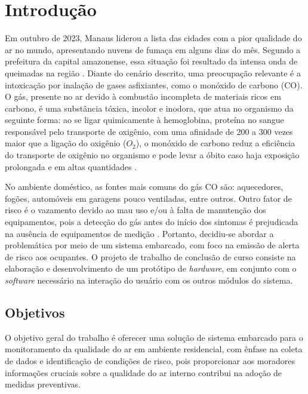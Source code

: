 \chapter{Introdução}

Em outubro de 2023, Manaus liderou a lista das cidades com a pior qualidade do ar no mundo, apresentando nuvens 
de fumaça em alguns dias do mês. Segundo a prefeitura da capital amazonense, essa situação foi resultado da 
intensa onda de queimadas na região \cite{G1-ar-manaus}. Diante do cenário descrito, uma preocupação relevante 
é a intoxicação por inalação de gases asfixiantes, como o monóxido de carbono (CO). O gás, presente no ar devido à combustão 
incompleta de materiais ricos em carbono, é uma substância tóxica, incolor e inodora, que atua no organismo da 
seguinte forma: ao se ligar quimicamente à hemoglobina, proteína no sangue responsável pelo transporte de oxigênio, com uma afinidade de 
200 a 300 vezes maior que a ligação do oxigênio ($O_{2}$), o monóxido de carbono reduz a eficiência do transporte de oxigênio no organismo e 
pode levar a óbito caso haja exposição prolongada e em altas quantidades \cite{carbon-monoxide-poisoning-varon}.

No ambiente doméstico, as fontes mais comuns do gás CO são: aquecedores, fogões, automóveis 
em garagens pouco ventiladas, entre outros. Outro fator de risco é o vazamento devido ao mau 
uso e/ou à falta de manutenção dos equipamentos, pois a detecção do gás antes do início dos 
sintomas é prejudicada na ausência de equipamentos de medição \cite{bio-sufocantes-hernandez2022}. Portanto, 
decidiu-se abordar a problemática por meio de um sistema embarcado, com foco na emissão de 
alerta de risco aos ocupantes. O projeto de trabalho de conclusão de curso consiste na elaboração e 
desenvolvimento de um protótipo de \textit{hardware}, em conjunto com o \textit{software} necessário na 
interação do usuário com os outros módulos do sistema. 

\section{Objetivos}

O objetivo geral do trabalho é oferecer uma solução de sistema embarcado para o monitoramento da qualidade do ar em ambiente residencial, com 
ênfase na coleta de dados e identificação de condições de risco, pois proporcionar aos moradores informações cruciais sobre a qualidade do ar interno 
contribui na adoção de medidas preventivas.

